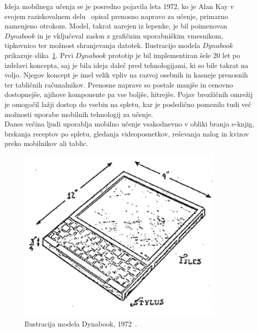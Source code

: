 \documentclass[a4paper, 12pt]{book}
\begin{document}
Ideja mobilnega učenja se je posredno pojavila leta 1972, ko je Alan Kay v svojem raziskovalnem delu~\cite{kay} opisal prenosno napravo za učenje, primarno namenjeno otrokom. Model, takrat narejen iz lepenke, je bil poimenovan $Dynabook$ in je vključeval zaslon z grafičnim uporabniškim vmesnikom, tipkovnico ter možnost shranjevanja datotek. Ilustracijo modela $Dynabook$ prikazuje slika~\ref{pic1}. Prvi $Dynabook$ prototip je bil implementiran šele 20 let po izdelavi koncepta, saj je bila ideja daleč pred tehnologijami, ki so bile takrat na voljo. Njegov koncept je imel velik vpliv na razvoj osebnih in kasneje prenosnih ter tabličnih računalnikov.
Prenosne naprave so postale manjše in cenovno dostopnejše, njihove komponente pa vse boljše, hitrejše. Pojav brezžičnih omrežij je omogočil lažji dostop do vsebin na spletu, kar je posledično pomenilo tudi več možnosti uporabe mobilnih tehnologij za učenje.\\
Danes večina ljudi uporablja mobilno učenje vsakodnevno v obliki branja e-knjig, brskanja receptov po spletu, gledanja videoposnetkov, reševanja nalog in kvizov preko mobilnikov ali tablic.

\begin{figure}
\begin{center}
\includegraphics[width=10cm]{slike/dyna_skica.png}
\end{center}
\caption{Ilustracija modela Dynabook, 1972~\cite{kay}.}
\label{pic1}
\end{figure}
\end{document}
